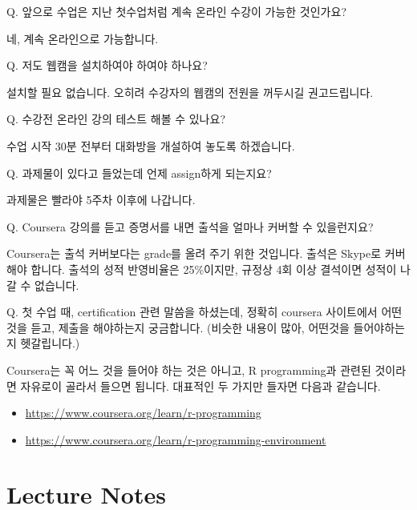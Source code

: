 \documentclass[12pt,]{krantz}
\providecommand{\tightlist}{%
  \setlength{\itemsep}{0pt}\setlength{\parskip}{0pt}}
\renewenvironment{quote}{\begin{VF}}{\end{VF}}
\theoremstyle{definition}
\theoremstyle{definition}
\theoremstyle{remark}
\begin{document}
\begin{quote}
Q. 앞으로 수업은 지난 첫수업처럼 계속 온라인 수강이 가능한 것인가요?
\end{quote}

네, 계속 온라인으로 가능합니다.

\begin{quote}
Q. 저도 웹캠을 설치하여야 하여야 하나요?
\end{quote}

설치할 필요 없습니다. 오히려 수강자의 웹캠의 전원을 꺼두시길
권고드립니다.

\begin{quote}
Q. 수강전 온라인 강의 테스트 해볼 수 있나요?
\end{quote}

수업 시작 30분 전부터 대화방을 개설하여 놓도록 하겠습니다.

\begin{quote}
Q. 과제물이 있다고 들었는데 언제 assign하게 되는지요?
\end{quote}

과제물은 빨라야 5주차 이후에 나갑니다.

\begin{quote}
Q. Coursera 강의를 듣고 증명서를 내면 출석을 얼마나 커버할 수
있을런지요?
\end{quote}

Coursera는 출석 커버보다는 grade를 올려 주기 위한 것입니다. 출석은
Skype로 커버해야 합니다. 출석의 성적 반영비율은 25\%이지만, 규정상 4회
이상 결석이면 성적이 나갈 수 없습니다.

\begin{quote}
Q. 첫 수업 때, certification 관련 말씀을 하셨는데, 정확히 coursera
사이트에서 어떤 것을 듣고, 제출을 해야하는지 궁금합니다. (비슷한 내용이
많아, 어떤것을 들어야하는지 헷갈립니다.)
\end{quote}

Coursera는 꼭 어느 것을 들어야 하는 것은 아니고, R programming과 관련된
것이라면 자유로이 골라서 들으면 됩니다. 대표적인 두 가지만 들자면 다음과
같습니다.

\begin{itemize}
\tightlist
\item
  \url{https://www.coursera.org/learn/r-programming}
\item
  \url{https://www.coursera.org/learn/r-programming-environment}
\end{itemize}

\mainmatter

\part{Lecture Notes}\label{part-lecture-notes}
\end{document}
